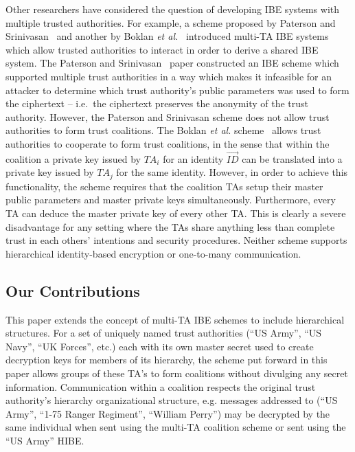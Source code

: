 \documentclass{IEEEtran}
\newcommand{\ID}{\mathit{ID}}
\newcommand{\TA}{\mathit{TA}}
\begin{document}
Other researchers have considered the question of developing IBE
systems with multiple trusted authorities. For example, a scheme
proposed by Paterson and Srinivasan~\cite{Paterson08} and another by
Boklan \emph{et al.}~\cite{Boklan08} introduced multi-TA IBE systems
which allow trusted authorities to interact in order to derive a
shared IBE system. The Paterson and Srinivasan~\cite{Paterson08}
paper constructed an IBE scheme which supported multiple trust
authorities in a way which makes it infeasible for an attacker to
determine which trust authority's public parameters was used to form
the ciphertext -- i.e.\ the ciphertext preserves the anonymity of
the trust authority. However, the Paterson and Srinivasan scheme
does not allow trust authorities to form trust coalitions. The
Boklan \emph{et al.} scheme~\cite{Boklan08} allows trust authorities
to cooperate to form trust coalitions, in the sense that within the
coalition a private key issued by $\TA_i$ for an identity
$\vec{\ID}$ can be translated into a private key issued by $\TA_j$
for the same identity. However, in order to achieve this
functionality, the scheme requires that the coalition TAs setup
their master public parameters and master private keys
simultaneously. Furthermore, every TA can deduce the master private
key of every other TA. This is clearly a severe disadvantage for any
setting where the TAs share anything less than complete trust in
each others' intentions and security procedures. Neither scheme
supports hierarchical identity-based encryption or one-to-many
communication.


\subsection{Our Contributions}


This paper extends the concept of multi-TA IBE schemes to include
hierarchical structures. For a set of uniquely named trust
authorities (``US Army'', ``US Navy'', ``UK Forces'', etc.) each
with its own master secret used to create decryption keys for
members of its hierarchy, the scheme put forward in this paper
allows groups of these TA's to form coalitions without divulging any
secret information. Communication within a coalition respects the
original trust authority's hierarchy organizational structure, e.g.
messages addressed to (``US Army'', ``1-75 Ranger Regiment'',
``William Perry'') may be decrypted by the same individual when sent
using the multi-TA coalition scheme or sent using the ``US Army''
HIBE.
\end{document}
